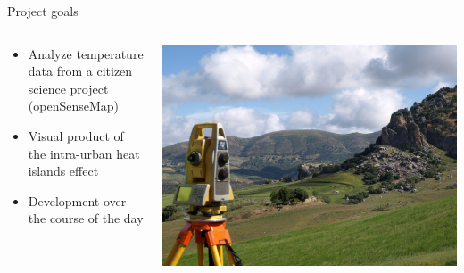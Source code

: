 \begin{frame}{Project goals}
\begin{columns}[T] %
	\begin{column}{.56\textwidth}
		\begin{itemize}
			\item Analyze temperature data from a citizen science project (openSenseMap)
			\item Visual product of the intra-urban heat islands effect
			\item Development over the course of the day
		\end{itemize}
	\end{column}%
	\hfill%
	\begin{column}{.48\textwidth}
		\includegraphics[width=\linewidth]{images/background}
	\end{column}%
\end{columns}
\end{frame}